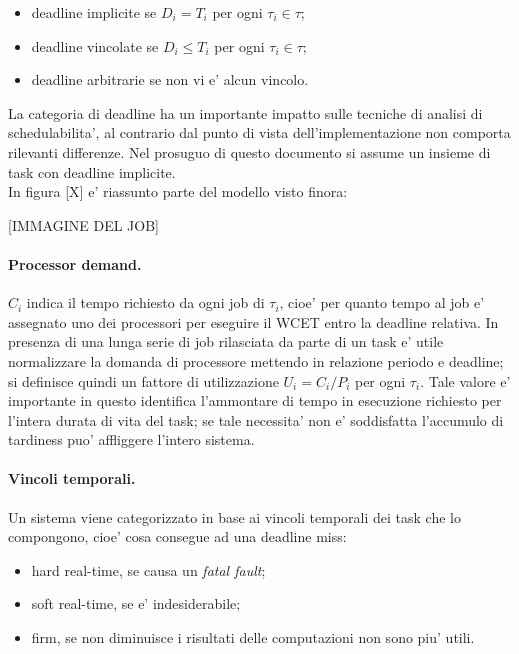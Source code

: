 \begin{itemize}
	\item deadline implicite se $D_i = T_i$ per ogni $\tau_i \in \tau$;
	\item deadline vincolate se $D_i \leq T_i$ per ogni $\tau_i \in \tau$;
	\item deadline arbitrarie se non vi e' alcun vincolo.
\end{itemize}

La categoria di deadline ha un importante impatto sulle tecniche di analisi di schedulabilita', al contrario dal punto di vista dell'implementazione non comporta rilevanti differenze. Nel prosuguo di questo documento si assume un insieme di task con deadline implicite.\\

In figura [X] e' riassunto parte del modello visto finora:

[IMMAGINE DEL JOB]

\paragraph{Processor demand.} $C_i$ indica il tempo richiesto da ogni job di $\tau_i$, cioe' per quanto tempo al job e' assegnato uno dei processori per eseguire il WCET entro la deadline relativa. In presenza di una lunga serie di job rilasciata da parte di un task e' utile normalizzare la domanda di processore mettendo in relazione periodo e deadline; si definisce quindi un fattore di utilizzazione $U_i = C_i / P_i$ per ogni $\tau_i$. Tale valore e' importante in questo identifica l'ammontare di tempo in esecuzione richiesto per l'intera durata di vita del task; se tale necessita' non e' soddisfatta l'accumulo di tardiness puo' affliggere l'intero sistema.

\paragraph{Vincoli temporali.} Un sistema viene categorizzato in base ai vincoli temporali dei task che lo compongono, cioe' cosa consegue ad una deadline miss:
\begin{itemize}
	\item hard real-time, se causa un \textit{fatal fault};
	\item soft real-time, se e' indesiderabile;
	\item firm, se non diminuisce i risultati delle computazioni non sono piu' utili.
\end{itemize}

